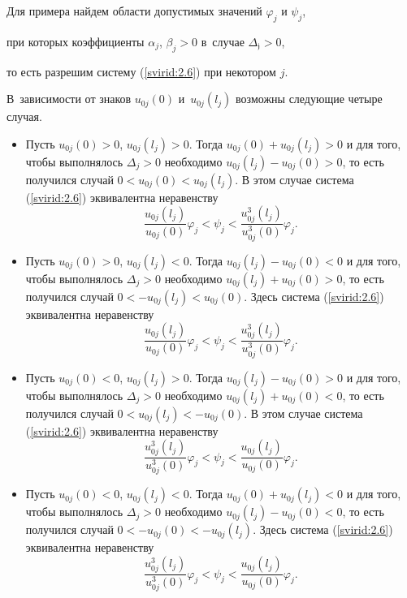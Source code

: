 Для примера найдем области допустимых значений $\varphi_j$ и $\psi_j$,

при которых коэффициенты $\alpha_j$, $\beta_j>0$ в~случае $\mathfrak{\Delta_j}>0$,

то есть разрешим систему (\ref{svirid:2.6}) при некотором $j$.

В~зависимости от знаков $u_{0j}(0)$ и~$u_{0j}(l_j)$ возможны следующие четыре случая.



\begin{itemize}

    \item [(i)] Пусть $u_{0j}(0)>0$, $u_{0j}(l_j)>0$. Тогда $u_{0j}(0)+u_{0j}(l_j)>0$ и для того, чтобы выполнялось $\mathfrak{\Delta}_j>0$ необходимо $u_{0j}(l_j)-u_{0j}(0)>0$, то есть получился случай $0<u_{0j}(0)<u_{0j}(l_j)$. В этом случае система (\ref{svirid:2.6}) эквивалентна неравенству $$\frac{u_{0j}(l_j)}{u_{0j}(0)}\varphi_j<\psi_j<\frac{u_{0j}^3(l_j)}{u_{0j}^3(0)}\varphi_j.$$



\item [(ii)] Пусть $u_{0j}(0)>0$, $u_{0j}(l_j)<0$. Тогда $u_{0j}(l_j)-u_{0j}(0)<0$ и для того, чтобы выполнялось $\mathfrak{\Delta}_j>0$ необходимо $u_{0j}(l_j)+u_{0j}(0)>0$, то есть получился случай $0<-u_{0j}(l_j)<u_{0j}(0)$. Здесь система (\ref{svirid:2.6}) эквивалентна неравенству $$\frac{u_{0j}(l_j)}{u_{0j}(0)}\varphi_j<\psi_j<\frac{u_{0j}^3(l_j)}{u_{0j}^3(0)}\varphi_j.$$



\item [(iii)] Пусть $u_{0j}(0)<0$, $u_{0j}(l_j)>0$. Тогда $u_{0j}(l_j)-u_{0j}(0)>0$ и для того, чтобы выполнялось $\mathfrak{\Delta}_j>0$ необходимо $u_{0j}(l_j)+u_{0j}(0)<0$, то есть получился случай $0<u_{0j}(l_j)<-u_{0j}(0)$. В этом случае система (\ref{svirid:2.6}) эквивалентна неравенству $$\frac{u_{0j}^3(l_j)}{u_{0j}^3(0)}\varphi_j<\psi_j<\frac{u_{0j}(l_j)}{u_{0j}(0)}\varphi_j.$$

\item [(iv)] Пусть $u_{0j}(0)<0$, $u_{0j}(l_j)<0$. Тогда $u_{0j}(0)+u_{0j}(l_j)<0$ и для того, чтобы выполнялось $\mathfrak{\Delta}_j>0$ необходимо $u_{0j}(l_j)-u_{0j}(0)<0$, то есть получился случай $0<-u_{0j}(0)<-u_{0j}(l_j)$. Здесь система (\ref{svirid:2.6}) эквивалентна неравенству $$\frac{u_{0j}^3(l_j)}{u_{0j}^3(0)}\varphi_j<\psi_j<\frac{u_{0j}(l_j)}{u_{0j}(0)}\varphi_j.$$

\end{itemize}

